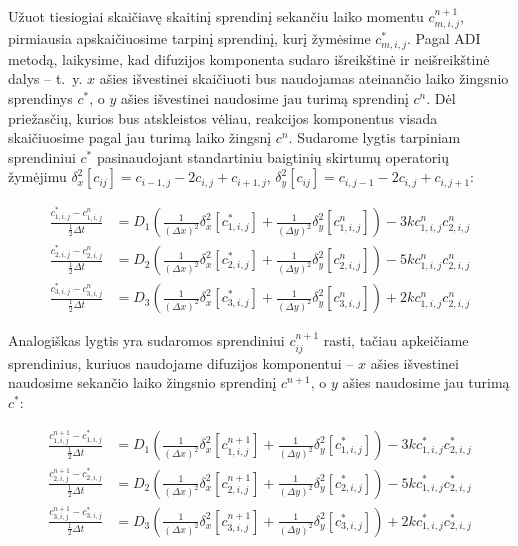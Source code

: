 Užuot tiesiogiai skaičiavę skaitinį sprendinį sekančiu laiko momentu $c^{n+1}_{m,i,j}$, pirmiausia apskaičiuosime tarpinį sprendinį, kurį žymėsime $c^*_{m,i,j}$. Pagal ADI metodą, laikysime, kad difuzijos komponenta sudaro išreikštinė ir neišreikštinė dalys -- \hbox{t. y.} $x$ ašies išvestinei skaičiuoti bus naudojamas ateinančio laiko žingsnio sprendinys $c^*$, o $y$ ašies išvestinei naudosime jau turimą sprendinį $c^n$. Dėl priežasčių, kurios bus atskleistos vėliau, reakcijos komponentus visada skaičiuosime pagal jau turimą laiko žingsnį $c^n$. Sudarome lygtis tarpiniam sprendiniui $c^*$ pasinaudojant standartiniu baigtinių skirtumų operatorių žymėjimu $\delta_x^2[c_{ij}]=c_{i-1,j}-2c_{i,j}+c_{i+1,j}$, $\delta_y^2[c_{ij}]=c_{i,j-1}-2c_{i,j}+c_{i,j+1}$:

\begin{align}
    \frac{c^*_{1,i,j} - c^n_{1,i,j}}{\frac{1}{2}\Delta t} &= D_1 \left( \frac{1}{(\Delta x)^2}\delta_x^2[c^*_{1,i,j}] + \frac{1}{(\Delta y)^2}\delta_y^2[c^n_{1,i,j}] \right) - 3kc^n_{1,i,j}c^n_{2,i,j}\\
    \frac{c^*_{2,i,j} - c^n_{2,i,j}}{\frac{1}{2}\Delta t} &= D_2 \left( \frac{1}{(\Delta x)^2}\delta_x^2[c^*_{2,i,j}] + \frac{1}{(\Delta y)^2}\delta_y^2[c^n_{2,i,j}] \right) - 5kc^n_{1,i,j}c^n_{2,i,j}\\
    \frac{c^*_{3,i,j} - c^n_{3,i,j}}{\frac{1}{2}\Delta t} &= D_3 \left( \frac{1}{(\Delta x)^2}\delta_x^2[c^*_{3,i,j}] + \frac{1}{(\Delta y)^2}\delta_y^2[c^n_{3,i,j}] \right) +2kc^n_{1,i,j}c^n_{2,i,j}
\end{align}

Analogiškas lygtis yra sudaromos sprendiniui $c^{n+1}_{ij}$ rasti, tačiau apkeičiame sprendinius, kuriuos naudojame difuzijos komponentui -- $x$ ašies išvestinei naudosime sekančio laiko žingsnio sprendinį $c^{n+1}$, o $y$ ašies naudosime jau turimą $c^*$:

\begin{align}
    \frac{c^{n+1}_{1,i,j} - c^*_{1,i,j}}{\frac{1}{2}\Delta t} &= D_1 \left( \frac{1}{(\Delta x)^2}\delta_x^2[c^{n+1}_{1,i,j}] + \frac{1}{(\Delta y)^2}\delta_y^2[c^*_{1,i,j}] \right) - 3kc^*_{1,i,j}c^*_{2,i,j}\\
    \frac{c^{n+1}_{2,i,j} - c^*_{2,i,j}}{\frac{1}{2}\Delta t} &= D_2 \left( \frac{1}{(\Delta x)^2}\delta_x^2[c^{n+1}_{2,i,j}] + \frac{1}{(\Delta y)^2}\delta_y^2[c^*_{2,i,j}] \right) - 5kc^*_{1,i,j}c^*_{2,i,j}\\
    \frac{c^{n+1}_{3,i,j} - c^*_{3,i,j}}{\frac{1}{2}\Delta t} &= D_3 \left( \frac{1}{(\Delta x)^2}\delta_x^2[c^{n+1}_{3,i,j}] + \frac{1}{(\Delta y)^2}\delta_y^2[c^*_{3,i,j}] \right) +2kc^*_{1,i,j}c^*_{2,i,j}
\end{align}

